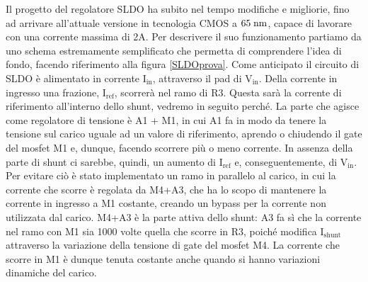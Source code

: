 Il progetto del regolatore SLDO ha subito nel tempo modifiche e migliorie, fino ad arrivare all'attuale versione in tecnologia CMOS a $65\rm \; nm$, capace di lavorare con una corrente massima di 2A.
Per descrivere il suo funzionamento partiamo da uno schema estremamente semplificato che permetta di comprendere l'idea di fondo, facendo riferimento alla figura \ref{SLDOprova}. 
Come anticipato il circuito di SLDO è alimentato in corrente $\mathrm{I_{in}}$, attraverso il pad di $\mathrm{V_{in}}$. 
Della corrente in ingresso una frazione, $\mathrm{I_{ref}}$, scorrerà nel ramo di R3.
Questa sarà la corrente di riferimento all'interno dello shunt, vedremo in seguito perché. 
La parte che agisce come regolatore di tensione è A1 + M1, in cui A1 fa in modo da tenere la tensione sul carico uguale ad un valore di riferimento, aprendo o chiudendo il gate del mosfet M1 e, dunque, facendo scorrere più o meno corrente. 
In assenza della parte di shunt ci sarebbe, quindi, un aumento di $\mathrm{I_{ref}}$ e, conseguentemente, di $\mathrm{V_{in}}$. 
Per evitare ciò è stato implementato un ramo in parallelo al carico, in cui la corrente che scorre è regolata da M4+A3, che ha lo scopo di mantenere la corrente in ingresso a M1 costante, creando un bypass per la corrente non utilizzata dal carico. 
M4+A3 è la parte attiva dello shunt: A3 fa sì che la corrente nel ramo con M1 sia 1000 volte quella che scorre in R3, poiché modifica $\mathrm{I_{shunt}}$ attraverso la variazione della tensione di gate del mosfet M4.
La corrente che scorre in M1 è dunque tenuta costante anche quando si hanno variazioni dinamiche del carico.

